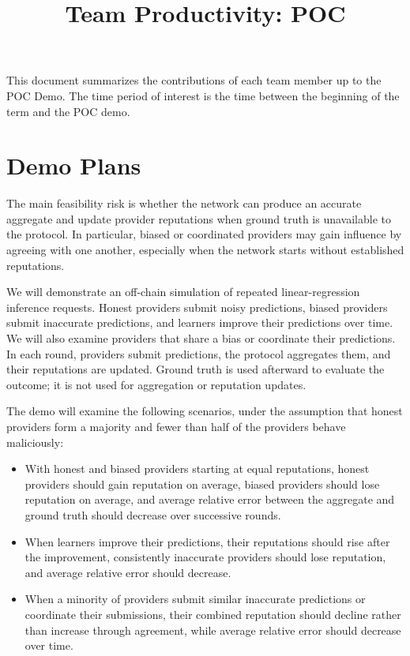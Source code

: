 \documentclass{article}
\title{Team Productivity: POC\\\progname}
\author{\authname}
\date{}
\begin{document}
\maketitle

This document summarizes the contributions of each team member up to the POC
Demo.  The time period of interest is the time between the beginning of the term
and the POC demo.


\section{Demo Plans}

The main feasibility risk is whether the network can produce an accurate aggregate
and update provider reputations when ground truth is unavailable to the protocol.
In particular, biased or coordinated providers may gain influence by agreeing with
one another, especially when the network starts without established reputations.

We will demonstrate an off-chain simulation of repeated linear-regression inference
requests. Honest providers submit noisy predictions, biased providers submit
inaccurate predictions, and learners improve their predictions over time. We will
also examine providers that share a bias or coordinate their predictions. In each
round, providers submit predictions, the protocol aggregates them, and their
reputations are updated. Ground truth is used afterward to evaluate the outcome;
it is not used for aggregation or reputation updates.

The demo will examine the following scenarios, under the assumption that honest providers form a
majority and fewer than half of the providers behave maliciously:
\begin{itemize}
    \item With honest and biased providers starting at equal reputations, honest
    providers should gain reputation on average, biased providers should lose
    reputation on average, and average relative error between the aggregate and
    ground truth should decrease over successive rounds.
    \item When learners improve their predictions, their reputations should rise
    after the improvement, consistently inaccurate providers should lose
    reputation, and average relative error should decrease.
    \item When a minority of providers submit similar inaccurate predictions or
    coordinate their submissions, their combined reputation should decline
    rather than increase through agreement, while average relative error should
    decrease over time.
\end{itemize}
\end{document}
